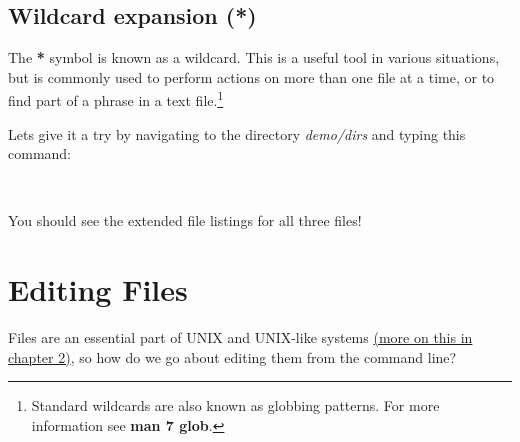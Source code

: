 \documentclass[oneside]{book}
\newcommand{\commandline}[1]{\begin{center} \colorbox{Dark}{\textcolor{white}{#1}} \end{center}}
\begin{document}
\subsection{Wildcard expansion (*)}
The \textbf{*} symbol is known as a wildcard. This is a useful tool in various situations, but is commonly used to perform actions on more than one file at a time, or to find part of a phrase in a text file.\footnote{Standard wildcards are also known as globbing patterns. For more information see \textbf{man 7 glob}.} 

Lets give it a try by navigating to the directory \textit{demo/dirs} and typing this command:
\commandline{ls -l f*}

You should see the extended file listings for all three files!

\section{Editing Files}
Files are an essential part of UNIX and UNIX-like systems \hyperref[sec:files_in_unix]{(more on this in chapter 2)}, so how do we go about editing them from the command line? 
\end{document}
